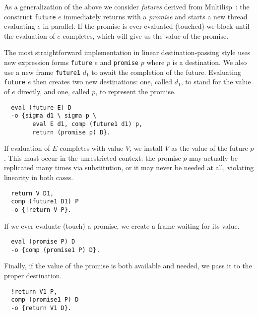 \documentclass{sig-alt}
\begin{document}
As a generalization of the above we consider \emph{futures} derived from
Multilisp~\cite{Halstead85}: the construct \verb"future" $e$ immediately
returns with a \emph{promise} and starts a new thread evaluating $e$ in
parallel.  If the promise is ever evaluated (touched) we block until the
evaluation of $e$ completes, which will give us the value of the
promise.

The most straightforward implementation in linear destination-passing
style uses new expression forms \verb"future" $e$ and \verb"promise" $p$ where
$p$ is a destination.  We also use a new frame \verb"future1" $d_1$ to
await the completion of the future. 
Evaluating \verb"future" $e$ then creates two
new destinations: one, called $d_1$, to stand for the value of 
$e$ directly, and one, called $p$, to represent the promise.

\begin{small}\begin{verbatim}
  eval (future E) D
  -o {sigma d1 \ sigma p \ 
        eval E d1, comp (future1 d1) p,
        return (promise p) D}.
\end{verbatim}\end{small}
\noindent
If evaluation of $E$ completes with value $V$, we install $V$
as the value of the future $p$.  This must occur in
the unrestricted context: the promise $p$ may actually be
replicated many times via substitution, or it may never be needed at
all, violating linearity in both cases.

\begin{small}\begin{verbatim}
  return V D1,
  comp (future1 D1) P
  -o {!return V P}.
\end{verbatim}\end{small}
\noindent
If we ever evaluate (touch) a promise, we create a frame waiting
for its value.

\begin{small}\begin{verbatim}
  eval (promise P) D
  -o {comp (promise1 P) D}.
\end{verbatim}\end{small}
\noindent
Finally, if the value of the promise is both available and needed,
we pass it to the proper destination.

\begin{small}\begin{verbatim}
  !return V1 P,
  comp (promise1 P) D
  -o {return V1 D}.
\end{verbatim}\end{small}
\end{document}
